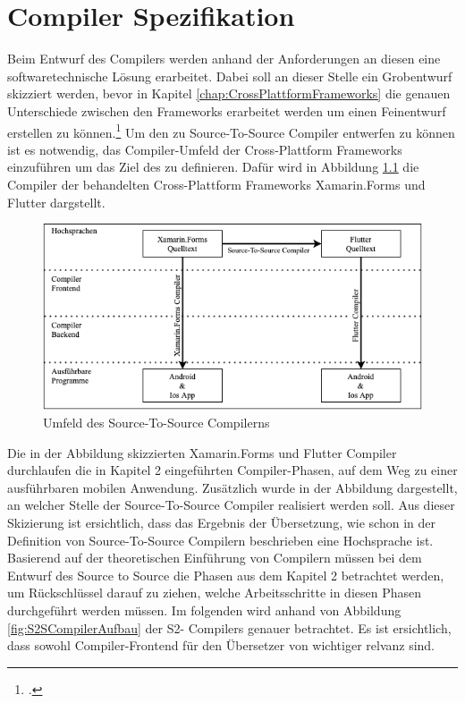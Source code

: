 \chapter{Compiler Spezifikation}
\label{chap:CompilerEntwurf}
Beim Entwurf des Compilers werden anhand der Anforderungen an diesen eine softwaretechnische Lösung erarbeitet.  Dabei soll an dieser Stelle ein Grobentwurf skizziert werden, bevor in Kapitel \ref{chap:CrossPlattformFrameworks} die genauen Unterschiede zwischen den Frameworks erarbeitet werden um einen Feinentwurf erstellen zu können.\footcite[Vgl.][S.6]{Balzert2011}
Um den zu Source-To-Source Compiler entwerfen zu können ist es notwendig,  das Compiler-Umfeld der Cross-Plattform Frameworks einzuführen um das Ziel des zu definieren.  Dafür wird in Abbildung \ref{fig:CompilerArchitecture} die Compiler der behandelten Cross-Plattform Frameworks Xamarin.Forms und Flutter dargstellt. 

\begin{figure}[!ht]
 \includegraphics[width=14.5cm]{Images/CompilerArchitecture/CompilerStructure.png}
 \caption{Umfeld des Source-To-Source Compilerns}
 \label{fig:CompilerArchitecture}
\end{figure}

Die in der Abbildung skizzierten Xamarin.Forms und Flutter Compiler durchlaufen die in Kapitel 2 eingeführten Compiler-Phasen,  auf dem Weg zu einer ausführbaren mobilen Anwendung.  Zusätzlich wurde in der Abbildung dargestellt,  an welcher Stelle der Source-To-Source Compiler realisiert werden soll.  Aus dieser Skizierung ist ersichtlich, dass das Ergebnis der Übersetzung, wie schon in der Definition von Source-To-Source Compilern beschrieben eine Hochsprache ist.  
Basierend auf der theoretischen Einführung von Compilern müssen bei dem Entwurf des Source to Source die Phasen aus dem Kapitel 2 betrachtet werden,  um Rückschlüssel darauf zu ziehen,  welche Arbeitsschritte in diesen Phasen durchgeführt werden müssen. Im folgenden wird anhand von Abbildung  \ref{fig:S2SCompilerAufbau} der S2- Compilers genauer betrachtet. Es ist ersichtlich,  dass sowohl Compiler-Frontend für den Übersetzer von wichtiger relvanz sind. 

